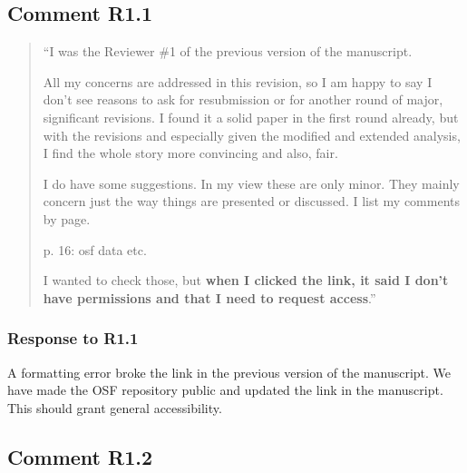 \documentclass[12pt]{article}
\begin{document}
\subsection*{Comment R1.1}
\begin{quote}
``I was the Reviewer \#1 of the previous version of the manuscript.

All my concerns are addressed in this revision, so I am happy to say I don't see reasons to ask for resubmission or for another round of major, significant revisions. I found it a solid paper in the first round already, but with the revisions and especially given the modified and extended analysis, I find the whole story more convincing and also, fair.

I do have some suggestions. In my view these are only minor. They mainly concern just the way things are presented or discussed. I list my comments by page.

p. 16: osf data etc.

I wanted to check those, but \textbf{when I clicked the link, it said I don't have permissions and that I need to request access}.''
\end{quote}

\subsubsection*{Response to R1.1}
A formatting error broke the link in the previous version of the manuscript. We have made the OSF repository public and updated the link in the manuscript. This should grant general accessibility.


\subsection*{Comment R1.2}
\end{document}
